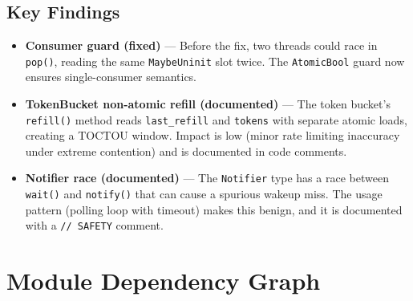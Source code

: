 \documentclass[a4paper, 11pt]{article}
\begin{document}
\subsection{Key Findings}

\begin{itemize}[nosep]
  \item \textbf{Consumer guard (fixed)} --- Before the fix, two threads
        could race in \texttt{pop()}, reading the same
        \texttt{MaybeUninit} slot twice.  The \texttt{AtomicBool} guard
        now ensures single-consumer semantics.

  \item \textbf{TokenBucket non-atomic refill (documented)} --- The
        token bucket's \texttt{refill()} method reads
        \texttt{last\_refill} and \texttt{tokens} with separate atomic
        loads, creating a TOCTOU window.  Impact is low (minor rate
        limiting inaccuracy under extreme contention) and is documented
        in code comments.

  \item \textbf{Notifier race (documented)} --- The \texttt{Notifier}
        type has a race between \texttt{wait()} and \texttt{notify()}
        that can cause a spurious wakeup miss.  The usage pattern
        (polling loop with timeout) makes this benign, and it is
        documented with a \texttt{// SAFETY} comment.
\end{itemize}


\section{Module Dependency Graph}
\end{document}

